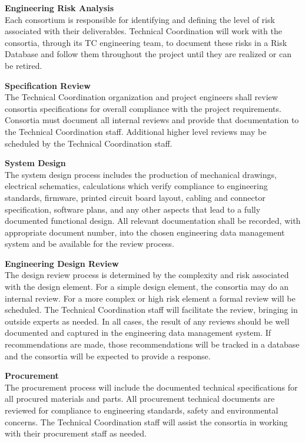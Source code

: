 {\bf Engineering Risk Analysis}\\
Each consortium is responsible for identifying and defining the level
of risk associated with their deliverables.   Technical
Coordination will work with the consortia, through its
TC engineering team, to document these risks in a Risk Database
and follow them throughout the project until they are realized or can
be retired.

{\bf Specification Review}\\
The  Technical Coordination organization and project engineers
shall review consortia specifications for overall compliance with the
project requirements.  Consortia must document all internal reviews
and provide that documentation to the Technical Coordination staff.
Additional higher level reviews may be scheduled by the Technical
Coordination staff.

{\bf System Design}\\
The system design process includes the production of mechanical
drawings, electrical schematics, calculations which verify compliance
to engineering standards, firmware, printed circuit board layout,
cabling and connector specification, software plans, and any other
aspects that lead to a fully documented functional design.  All
relevant documentation shall be recorded, with appropriate document
number, into the chosen engineering data management system and be
available for the review process.

{\bf Engineering Design Review}\\
The design review process is determined by the complexity and risk
associated with the design element.  For a simple design element, the
consortia may do an internal review.  For a more complex or high risk
element a formal review will be scheduled.  The  Technical
Coordination staff will facilitate the review, bringing in outside
experts as needed.  In all cases, the result of any reviews should be
well documented and captured in the engineering data management
system.  If recommendations are made, those recommendations will be
tracked in a database and the consortia will be expected to provide a
response.

{\bf Procurement}\\ The procurement process will include the
documented technical specifications for all procured materials and
parts.  All procurement technical documents are reviewed for
compliance to engineering standards, safety and environmental
concerns.  The  Technical Coordination staff will assist the
consortia in working with their procurement staff as needed.


